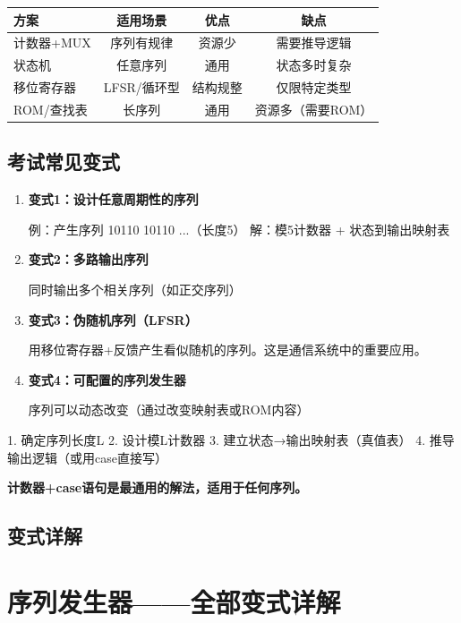 \begin{center}
\begin{tabular}{|l|c|c|c|}
\hline
\textbf{方案} & \textbf{适用场景} & \textbf{优点} & \textbf{缺点} \\
\hline
计数器+MUX & 序列有规律 & 资源少 & 需要推导逻辑 \\
状态机 & 任意序列 & 通用 & 状态多时复杂 \\
移位寄存器 & LFSR/循环型 & 结构规整 & 仅限特定类型 \\
ROM/查找表 & 长序列 & 通用 & 资源多（需要ROM） \\
\hline
\end{tabular}
\end{center}

\section{考试常见变式}

\begin{enumerate}
  \item \textbf{变式1：设计任意周期性的序列}

  例：产生序列 10110 10110 ...（长度5）
  解：模5计数器 + 状态到输出映射表

  \item \textbf{变式2：多路输出序列}

  同时输出多个相关序列（如正交序列）

  \item \textbf{变式3：伪随机序列（LFSR）}

  用移位寄存器+反馈产生看似随机的序列。这是通信系统中的重要应用。

  \item \textbf{变式4：可配置的序列发生器}

  序列可以动态改变（通过改变映射表或ROM内容）
\end{enumerate}

\begin{examtip}[序列发生器秒杀法]
1. 确定序列长度L
2. 设计模L计数器
3. 建立状态→输出映射表（真值表）
4. 推导输出逻辑（或用case直接写）

\textbf{计数器+case语句是最通用的解法，适用于任何序列。}
\end{examtip}

\section{变式详解}
\chapter{序列发生器——全部变式详解}

